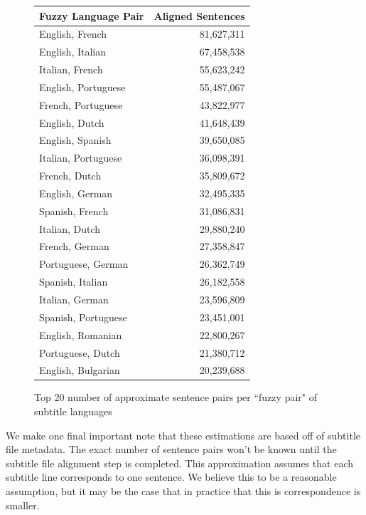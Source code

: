 \documentclass[twoside,twocolumn]{article}
\begin{document}
\begin{figure}[ht]
    \centering
    \begin{tabular}{ |l|r| }
        \hline
        \multicolumn{1}{|c|}{\textbf{Fuzzy Language Pair}} &
            \multicolumn{1}{|c|}{\textbf{Aligned Sentences}} \\
        \hline
        English, French     & 81,627,311 \\ \hline
        English, Italian    & 67,458,538 \\ \hline
        Italian, French     & 55,623,242 \\ \hline
        English, Portuguese & 55,487,067 \\ \hline
        French, Portuguese  & 43,822,977 \\ \hline
        English, Dutch      & 41,648,439 \\ \hline
        English, Spanish    & 39,650,085 \\ \hline
        Italian, Portuguese & 36,098,391 \\ \hline
        French, Dutch       & 35,809,672 \\ \hline
        English, German     & 32,495,335 \\ \hline
        Spanish, French     & 31,086,831 \\ \hline
        Italian, Dutch      & 29,880,240 \\ \hline
        French, German      & 27,358,847 \\ \hline
        Portuguese, German  & 26,362,749 \\ \hline
        Spanish, Italian    & 26,182,558 \\ \hline
        Italian, German     & 23,596,809 \\ \hline
        Spanish, Portuguese & 23,451,001 \\ \hline
        English, Romanian   & 22,800,267 \\ \hline
        Portuguese, Dutch   & 21,380,712 \\ \hline
        English, Bulgarian  & 20,239,688 \\ \hline
    \end{tabular}

    \caption{Top 20 number of approximate sentence pairs per ``fuzzy pair" of
             subtitle languages}
    \label{fig:fuzzy-pair-sentences}
\end{figure}

We make one final important note that these estimations are based off of
subtitle file metadata. The exact number of sentence pairs won't be known until
the subtitle file alignment step is completed. This approximation assumes that
each subtitle line corresponds to one sentence. We believe this to be a
reasonable assumption, but it may be the case that in practice that this is
correspondence is smaller.
\end{document}
